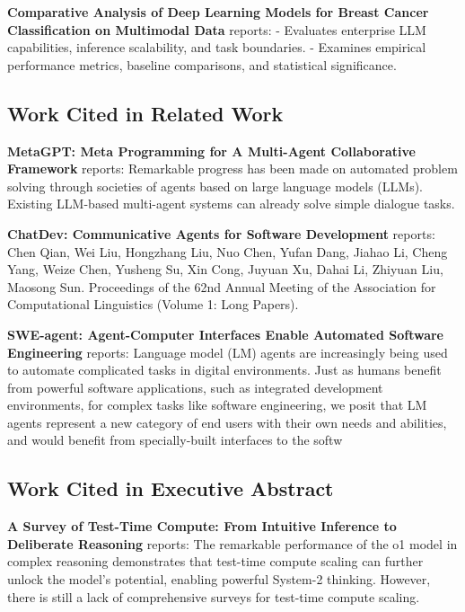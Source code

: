 \documentclass[10pt,twocolumn,letterpaper]{article}
\begin{document}
\textbf{Comparative Analysis of Deep Learning Models for Breast Cancer Classification on Multimodal Data} \cite{crossref_10_1145_3689096_3689462} reports: - Evaluates enterprise LLM capabilities, inference scalability, and task boundaries. - Examines empirical performance metrics, baseline comparisons, and statistical significance.


\subsection{Work Cited in Related Work}


\textbf{MetaGPT: Meta Programming for A Multi-Agent Collaborative Framework} \cite{crossref_10_48550_arxiv_2308_00352} reports: Remarkable progress has been made on automated problem solving through societies of agents based on large language models (LLMs). Existing LLM-based multi-agent systems can already solve simple dialogue tasks.

\textbf{ChatDev: Communicative Agents for Software Development} \cite{crossref_10_18653_v1_2024_acl_long_810} reports: Chen Qian, Wei Liu, Hongzhang Liu, Nuo Chen, Yufan Dang, Jiahao Li, Cheng Yang, Weize Chen, Yusheng Su, Xin Cong, Juyuan Xu, Dahai Li, Zhiyuan Liu, Maosong Sun. Proceedings of the 62nd Annual Meeting of the Association for Computational Linguistics (Volume 1: Long Papers).

\textbf{SWE-agent: Agent-Computer Interfaces Enable Automated Software Engineering} \cite{crossref_10_48550_arxiv_2405_15793} reports: Language model (LM) agents are increasingly being used to automate complicated tasks in digital environments. Just as humans benefit from powerful software applications, such as integrated development environments, for complex tasks like software engineering, we posit that LM agents represent a new category of end users with their own needs and abilities, and would benefit from specially-built interfaces to the softw


\subsection{Work Cited in Executive Abstract}


\textbf{A Survey of Test-Time Compute: From Intuitive Inference to Deliberate Reasoning} \cite{arxiv_2501_02497} reports: The remarkable performance of the o1 model in complex reasoning demonstrates that test-time compute scaling can further unlock the model's potential, enabling powerful System-2 thinking. However, there is still a lack of comprehensive surveys for test-time compute scaling.
\end{document}
